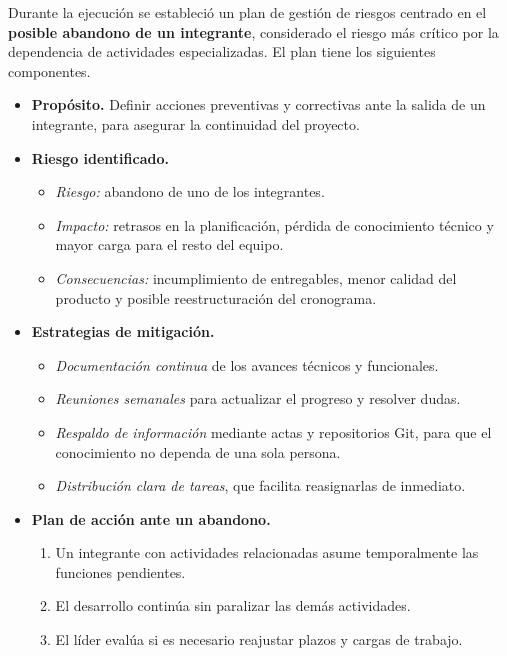 \documentclass[12pt,letterpaper]{article}
\begin{document}
Durante la ejecución se estableció un plan de gestión de riesgos centrado
en el \textbf{posible abandono de un integrante}, considerado el riesgo
más crítico por la dependencia de actividades especializadas. El plan
tiene los siguientes componentes.

\begin{itemize}
    \item \textbf{Propósito.} Definir acciones preventivas y correctivas
    ante la salida de un integrante, para asegurar la continuidad del
    proyecto.

    \item \textbf{Riesgo identificado.}
    \begin{itemize}
        \item \textit{Riesgo:} abandono de uno de los integrantes.
        \item \textit{Impacto:} retrasos en la planificación, pérdida de
        conocimiento técnico y mayor carga para el resto del equipo.
        \item \textit{Consecuencias:} incumplimiento de entregables, menor
        calidad del producto y posible reestructuración del cronograma.
    \end{itemize}

    \item \textbf{Estrategias de mitigación.}
    \begin{itemize}
        \item \textit{Documentación continua} de los avances técnicos y
        funcionales.
        \item \textit{Reuniones semanales} para actualizar el progreso y
        resolver dudas.
        \item \textit{Respaldo de información} mediante actas y
        repositorios Git, para que el conocimiento no dependa de una sola
        persona.
        \item \textit{Distribución clara de tareas}, que facilita
        reasignarlas de inmediato.
    \end{itemize}

    \item \textbf{Plan de acción ante un abandono.}
    \begin{enumerate}
        \item Un integrante con actividades relacionadas asume
        temporalmente las funciones pendientes.
        \item El desarrollo continúa sin paralizar las demás actividades.
        \item El líder evalúa si es necesario reajustar plazos y cargas de
        trabajo.
    \end{enumerate}


\end{itemize}
\end{document}
